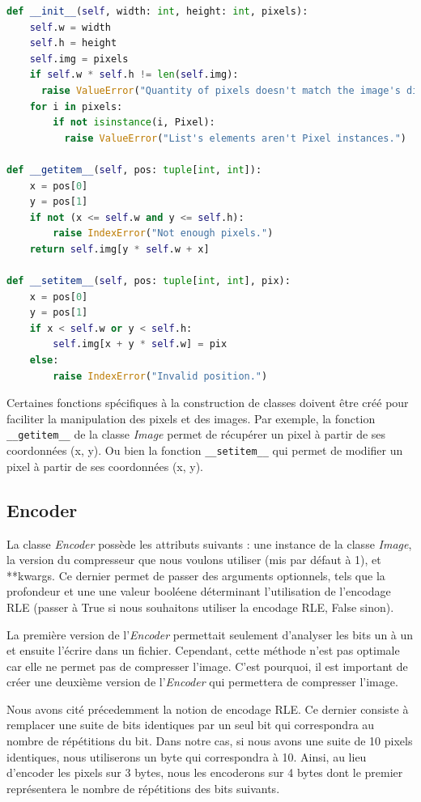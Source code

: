 \documentclass[utf8]{article}
\begin{document}
\begin{lstlisting}[language=Python, basicstyle=\small]
 def __init__(self, width: int, height: int, pixels):
    self.w = width
    self.h = height
    self.img = pixels
    if self.w * self.h != len(self.img):
      raise ValueError("Quantity of pixels doesn't match the image's dimension.")
    for i in pixels:
        if not isinstance(i, Pixel):
		  raise ValueError("List's elements aren't Pixel instances.")

def __getitem__(self, pos: tuple[int, int]):
    x = pos[0]
    y = pos[1]
    if not (x <= self.w and y <= self.h):
        raise IndexError("Not enough pixels.")
    return self.img[y * self.w + x]

def __setitem__(self, pos: tuple[int, int], pix):
    x = pos[0]
    y = pos[1]
    if x < self.w or y < self.h:
        self.img[x + y * self.w] = pix
    else:
        raise IndexError("Invalid position.")

\end{lstlisting}
Certaines fonctions spécifiques à la construction de classes doivent être créé pour faciliter la manipulation des pixels et des images. Par exemple, la fonction \texttt{__getitem__} de la classe \textit{Image} permet de récupérer un pixel à partir de ses coordonnées (x, y).
Ou bien la fonction \texttt{__setitem__} qui permet de modifier un pixel à partir de ses coordonnées (x, y).


\subsection{Encoder}
La classe \textit{Encoder} possède les attributs suivants : une instance de la classe \textit{Image}, la version du compresseur que nous  voulons utiliser (mis par défaut à 1), et **kwargs. Ce dernier permet de passer des arguments optionnels, tels que la profondeur et une une valeur booléene déterminant l'utilisation de l'encodage RLE (passer à True si nous souhaitons utiliser la encodage RLE, False sinon).

La première version de l'\textit{Encoder} permettait seulement d'analyser les bits un à un et ensuite l'écrire dans un fichier. Cependant, cette méthode n'est pas optimale car elle ne permet pas de compresser l'image. C'est pourquoi, il est important de créer une deuxième version de l'\textit{Encoder} qui permettera  de compresser l'image.

Nous avons cité précedemment la notion de encodage RLE. Ce dernier consiste à remplacer une suite de bits identiques par un seul bit qui correspondra au nombre de répétitions du bit. Dans notre cas, si nous avons une suite de 10 pixels identiques, nous utiliserons un byte qui correspondra à 10. Ainsi, au lieu d'encoder les pixels sur 3 bytes, nous les encoderons sur 4 bytes dont le premier représentera le nombre de répétitions des bits suivants.
\end{document}
